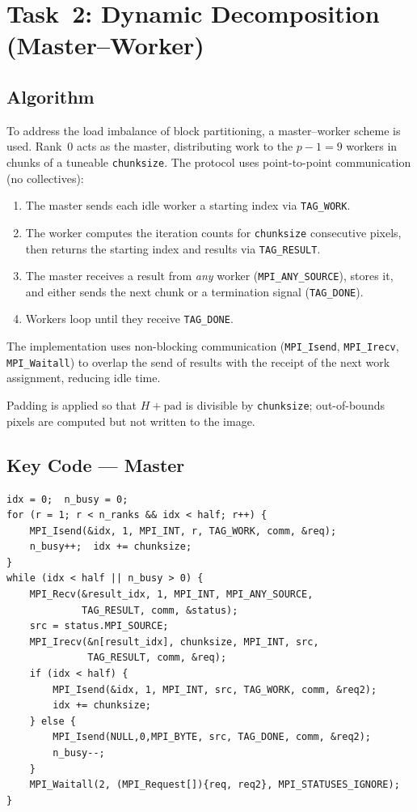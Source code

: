\documentclass[11pt,a4paper]{article}
\begin{document}
\section{Task~2: Dynamic Decomposition (Master--Worker)}
\label{sec:task2}

\subsection{Algorithm}

To address the load imbalance of block partitioning, a master--worker scheme
is used. Rank~0 acts as the master, distributing work to the $p{-}1 = 9$
workers in chunks of a tuneable \texttt{chunksize}. The protocol uses
point-to-point communication (no collectives):

\begin{enumerate}\itemsep0pt
\item The master sends each idle worker a starting index via \texttt{TAG\_WORK}.
\item The worker computes the iteration counts for \texttt{chunksize}
      consecutive pixels, then returns the starting index and results via
      \texttt{TAG\_RESULT}.
\item The master receives a result from \emph{any} worker
      (\texttt{MPI\_ANY\_SOURCE}), stores it, and either sends the next
      chunk or a termination signal (\texttt{TAG\_DONE}).
\item Workers loop until they receive \texttt{TAG\_DONE}.
\end{enumerate}

The implementation uses non-blocking communication (\texttt{MPI\_Isend},
\texttt{MPI\_Irecv}, \texttt{MPI\_Waitall}) to overlap the send of results
with the receipt of the next work assignment, reducing idle time.

Padding is applied so that $H + \text{pad}$ is divisible by
\texttt{chunksize}; out-of-bounds pixels are computed but not written to the
image.

\subsection{Key Code --- Master}
\begin{lstlisting}
idx = 0;  n_busy = 0;
for (r = 1; r < n_ranks && idx < half; r++) {
    MPI_Isend(&idx, 1, MPI_INT, r, TAG_WORK, comm, &req);
    n_busy++;  idx += chunksize;
}
while (idx < half || n_busy > 0) {
    MPI_Recv(&result_idx, 1, MPI_INT, MPI_ANY_SOURCE,
             TAG_RESULT, comm, &status);
    src = status.MPI_SOURCE;
    MPI_Irecv(&n[result_idx], chunksize, MPI_INT, src,
              TAG_RESULT, comm, &req);
    if (idx < half) {
        MPI_Isend(&idx, 1, MPI_INT, src, TAG_WORK, comm, &req2);
        idx += chunksize;
    } else {
        MPI_Isend(NULL,0,MPI_BYTE, src, TAG_DONE, comm, &req2);
        n_busy--;
    }
    MPI_Waitall(2, (MPI_Request[]){req, req2}, MPI_STATUSES_IGNORE);
}
\end{lstlisting}
\end{document}
